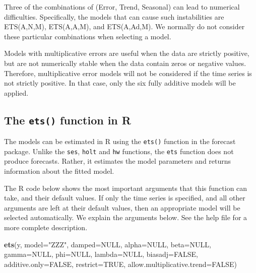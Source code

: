 \documentclass[]{book}
\newenvironment{Shaded}{\begin{snugshade}}{\end{snugshade}}
\newcommand{\DataTypeTok}[1]{\textcolor[rgb]{0.13,0.29,0.53}{#1}}
\newcommand{\KeywordTok}[1]{\textcolor[rgb]{0.13,0.29,0.53}{\textbf{#1}}}
\newcommand{\NormalTok}[1]{#1}
\newcommand{\OtherTok}[1]{\textcolor[rgb]{0.56,0.35,0.01}{#1}}
\newcommand{\StringTok}[1]{\textcolor[rgb]{0.31,0.60,0.02}{#1}}
\begin{document}
Three of the combinations of (Error, Trend, Seasonal) can lead to numerical difficulties. Specifically, the models that can cause such instabilities are ETS(A,N,M), ETS(A,A,M), and ETS(A,Ad,M). We normally do not consider these particular combinations when selecting a model.

Models with multiplicative errors are useful when the data are strictly positive, but are not numerically stable when the data contain zeros or negative values. Therefore, multiplicative error models will not be considered if the time series is not strictly positive. In that case, only the six fully additive models will be applied.

\hypertarget{the-ets-function-in-r}{%
\subsection*{\texorpdfstring{The \texttt{ets()} function in R}{The ets() function in R}}\label{the-ets-function-in-r}}

The models can be estimated in R using the \texttt{ets()} function in the forecast package. Unlike the \texttt{ses}, \texttt{holt} and \texttt{hw} functions, the \texttt{ets} function does not produce forecasts. Rather, it estimates the model parameters and returns information about the fitted model.

The R code below shows the most important arguments that this function can take, and their default values. If only the time series is specified, and all other arguments are left at their default values, then an appropriate model will be selected automatically. We explain the arguments below. See the help file for a more complete description.

\begin{Shaded}
\begin{Highlighting}[]
\KeywordTok{ets}\NormalTok{(y, }\DataTypeTok{model=}\StringTok{"ZZZ"}\NormalTok{, }\DataTypeTok{damped=}\OtherTok{NULL}\NormalTok{, }\DataTypeTok{alpha=}\OtherTok{NULL}\NormalTok{, }\DataTypeTok{beta=}\OtherTok{NULL}\NormalTok{, }\DataTypeTok{gamma=}\OtherTok{NULL}\NormalTok{,}
    \DataTypeTok{phi=}\OtherTok{NULL}\NormalTok{, }\DataTypeTok{lambda=}\OtherTok{NULL}\NormalTok{, }\DataTypeTok{biasadj=}\OtherTok{FALSE}\NormalTok{, }\DataTypeTok{additive.only=}\OtherTok{FALSE}\NormalTok{,}
    \DataTypeTok{restrict=}\OtherTok{TRUE}\NormalTok{, }\DataTypeTok{allow.multiplicative.trend=}\OtherTok{FALSE}\NormalTok{)}
\end{Highlighting}
\end{Shaded}
\end{document}
